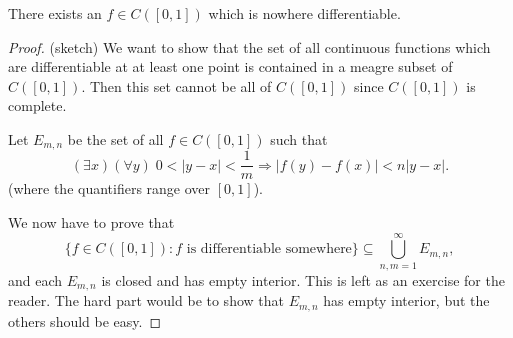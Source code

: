 \documentclass[a4paper]{article}
\begin{document}
\begin{prop}
  There exists an $f\in C([0, 1])$ which is nowhere differentiable.
\end{prop}

\begin{proof}(sketch)
  We want to show that the set of all continuous functions which are differentiable at at least one point is contained in a meagre subset of $C([0, 1])$. Then this set cannot be all of $C([0, 1])$ since $C([0, 1])$ is complete.

  Let $E_{m, n}$ be the set of all $f \in C([0, 1])$ such that
  \[
    (\exists x)(\forall y)\; 0 < |y - x| < \frac{1}{m} \Rightarrow |f(y) - f(x)| < n|y - x|.
  \]
  (where the quantifiers range over $[0, 1]$).

  We now have to prove that
  \[
    \{f \in C([0, 1]): f\text{ is differentiable somewhere}\} \subseteq \bigcup_{n, m = 1}^\infty E_{m, n},
  \]
  and each $E_{m, n}$ is closed and has empty interior. This is left as an exercise for the reader. The hard part would be to show that $E_{m, n}$ has empty interior, but the others should be easy. %
\end{proof}
\end{document}
